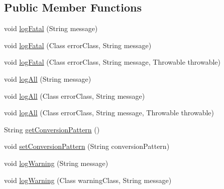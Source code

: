 \subsection*{Public Member Functions}
\begin{DoxyCompactItemize}
\item 
void \mbox{\hyperlink{classcom_1_1dlinkddns_1_1atulsaurabh_1_1erpecosystem_1_1logger_1_1_erp_ecosystem_logger_a366c4448e35274f7b1edec8112fb2553}{log\+Fatal}} (String message)
\item 
void \mbox{\hyperlink{classcom_1_1dlinkddns_1_1atulsaurabh_1_1erpecosystem_1_1logger_1_1_erp_ecosystem_logger_ae9010d95c151f9940d3c4bcbb9a2f4b1}{log\+Fatal}} (Class error\+Class, String message)
\item 
void \mbox{\hyperlink{classcom_1_1dlinkddns_1_1atulsaurabh_1_1erpecosystem_1_1logger_1_1_erp_ecosystem_logger_a3def664f09892d36bbff6343fa8f3d6f}{log\+Fatal}} (Class error\+Class, String message, Throwable throwable)
\item 
void \mbox{\hyperlink{classcom_1_1dlinkddns_1_1atulsaurabh_1_1erpecosystem_1_1logger_1_1_erp_ecosystem_logger_a360f98d9c9cf93c49fbb0a6a1e3e922f}{log\+All}} (String message)
\item 
void \mbox{\hyperlink{classcom_1_1dlinkddns_1_1atulsaurabh_1_1erpecosystem_1_1logger_1_1_erp_ecosystem_logger_a5bea48485386781a9eee8a78c2e2c9be}{log\+All}} (Class error\+Class, String message)
\item 
void \mbox{\hyperlink{classcom_1_1dlinkddns_1_1atulsaurabh_1_1erpecosystem_1_1logger_1_1_erp_ecosystem_logger_a2706d4afe3cf3f8dad301d43851181ce}{log\+All}} (Class error\+Class, String message, Throwable throwable)
\item 
String \mbox{\hyperlink{classcom_1_1dlinkddns_1_1atulsaurabh_1_1erpecosystem_1_1logger_1_1_erp_ecosystem_logger_a8f0373f6917c8fe5a3ddea2c2adf081c}{get\+Conversion\+Pattern}} ()
\item 
void \mbox{\hyperlink{classcom_1_1dlinkddns_1_1atulsaurabh_1_1erpecosystem_1_1logger_1_1_erp_ecosystem_logger_a16d43ce13e22b9fae1b9e3b55a086b06}{set\+Conversion\+Pattern}} (String conversion\+Pattern)
\item 
void \mbox{\hyperlink{classcom_1_1dlinkddns_1_1atulsaurabh_1_1erpecosystem_1_1logger_1_1_erp_ecosystem_logger_a4a4c244511da1da97773a5a7933552d2}{log\+Warning}} (String message)
\item 
void \mbox{\hyperlink{classcom_1_1dlinkddns_1_1atulsaurabh_1_1erpecosystem_1_1logger_1_1_erp_ecosystem_logger_a7f8550d69fe0f6062f80c0cda4c74d87}{log\+Warning}} (Class warning\+Class, String message)

\end{DoxyCompactItemize}
